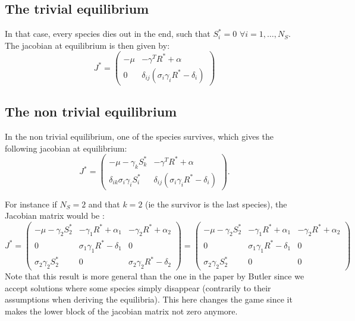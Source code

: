 \documentclass[12pt, titlepage]{report}
\begin{document}
		\subsection{The trivial equilibrium}
	In that case, every species dies out in the end, such that $S^*_i = 0$ $\forall i = 1,\dots, N_S$. The jacobian at equilibrium is then given by:
	\begin{equation}
		J^* =
		\begin{pmatrix}
			- \mu & -\gamma^T R^* + \alpha \\
			0 & \delta_{ij}(\sigma_i \gamma_i R^*-\delta_i)
		\end{pmatrix}
	\end{equation}
		\subsection{The non trivial equilibrium}
	In the non trivial equilibrium, one of the species survives, which gives the following jacobian at equilibrium:
	\begin{equation}
		J^* =
		\begin{pmatrix}
			-\mu-\gamma_k S^*_k & -\gamma^T R^*+\alpha \\
			\delta_{ik} \sigma_i \gamma_i S^*_i & \delta_{ij}(\sigma_i \gamma_i R^*-\delta_i)
		\end{pmatrix}.
	\end{equation}

	For instance if $N_S=2$ and that $k=2$ (ie the survivor is the last species), the Jacobian matrix would be :
	\begin{equation}
		J^* =
		\begin{pmatrix}
			-\mu-\gamma_2 S^*_2 & -\gamma_1 R^* + \alpha_1 & -\gamma_2 R^* +\alpha_2 \\
			0 & \sigma_1 \gamma_1 R^*-\delta_1 & 0 \\
			\sigma_2 \gamma_2 S^*_2 & 0 & \sigma_2 \gamma_2 R^* - \delta_2
		\end{pmatrix}
		=
		\begin{pmatrix}
			-\mu-\gamma_2 S^*_2 & -\gamma_1 R^* + \alpha_1 & -\gamma_2 R^* +\alpha_2 \\
			0 & \sigma_1 \gamma_1 R^*-\delta_1 & 0 \\
			\sigma_2 \gamma_2 S^*_2 & 0 & 0
		\end{pmatrix}
	\end{equation}
	Note that this result is more general than the one in the paper by Butler since we accept solutions where some species simply disappear (contrarily to their assumptions when deriving the equilibria). This here changes the game since it makes the lower block of the jacobian matrix not zero anymore.
\end{document}
